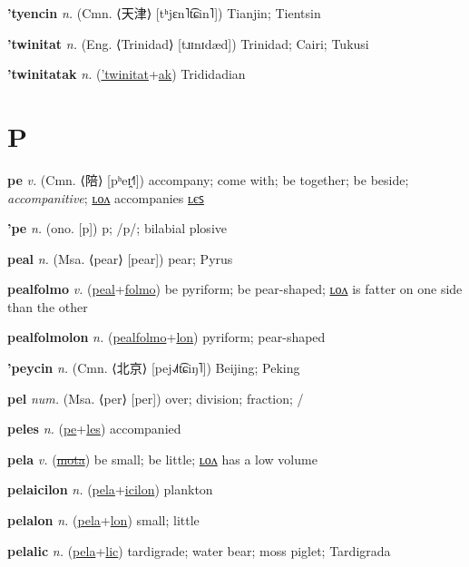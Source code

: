\textbf{\hypertarget{'tyencin}{'tyencin}} \textit{n.} (Cmn. ⟨{\chinese{}天津}⟩ [tʰjɛn˥t͡ɕin˥])
Tianjin; Tientsin

\textbf{\hypertarget{'twinitat}{'twinitat}} \textit{n.} (Eng. ⟨Trinidad⟩ [tɹɪnɪdæd])
Trinidad; Cairi; Tukusi

\textbf{\hypertarget{'twinitatak}{'twinitatak}} \textit{n.} (\hyperlink{'twinitat}{'twinitat}+\allowbreak \hyperlink{ak}{ak})
Trididadian

\section{P}

\textbf{\hypertarget{pe}{pe}} \textit{v.} (Cmn. ⟨{\chinese{}陪}⟩ [pʰeɪ̯˧˥])
accompany; come with; be together; be beside; \textit{accompanitive}; \hyperlink{pelon}{ʟᴏᴧ} accompanies \hyperlink{peles}{ʟєꜱ}

\textbf{\hypertarget{'pe}{'pe}} \textit{n.} (ono. [p])
p; /p/; bilabial plosive

\textbf{\hypertarget{peal}{peal}} \textit{n.} (Msa. ⟨pear⟩ [pear])
pear; Pyrus

\textbf{\hypertarget{pealfolmo}{pealfolmo}} \textit{v.} (\hyperlink{peal}{peal}+\allowbreak \hyperlink{folmo}{folmo})
be pyriform; be pear-shaped; \hyperlink{pealfolmolon}{ʟᴏᴧ} is fatter on one side than the other

\textbf{\hypertarget{pealfolmolon}{pealfolmolon}} \textit{n.} (\hyperlink{pealfolmo}{pealfolmo}+\allowbreak \hyperlink{lon}{lon})
pyriform; pear-shaped

\textbf{\hypertarget{'peycin}{'peycin}} \textit{n.} (Cmn. ⟨{\chinese{}北京}⟩ [pej˨˩˦t͡ɕiŋ˥])
Beijing; Peking

\textbf{\hypertarget{pel}{pel}} \textit{num.} (Msa. ⟨per⟩ [per])
over; division; fraction; /

\textbf{\hypertarget{peles}{peles}} \textit{n.} (\hyperlink{pe}{pe}+\allowbreak \hyperlink{les}{les})
accompanied

\textbf{\hypertarget{pela}{pela}} \textit{v.} (\hyperlink{mota}{\sout{mota}})
be small; be little; \hyperlink{pelalon}{ʟᴏᴧ} has a low volume

\textbf{\hypertarget{pelaicilon}{pelaicilon}} \textit{n.} (\hyperlink{pela}{pela}+\allowbreak \hyperlink{icilon}{icilon})
plankton

\textbf{\hypertarget{pelalon}{pelalon}} \textit{n.} (\hyperlink{pela}{pela}+\allowbreak \hyperlink{lon}{lon})
small; little

\textbf{\hypertarget{pelalic}{pelalic}} \textit{n.} (\hyperlink{pela}{pela}+\allowbreak \hyperlink{lic}{lic})
tardigrade; water bear; moss piglet; Tardigrada

